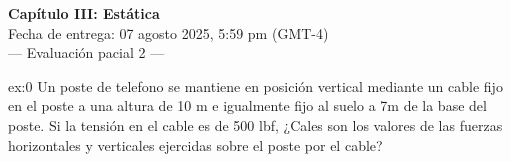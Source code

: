  \begin{multicols}{2}
     \begin{center}
         \LARGE{\textbf{Capítulo III: Estática}}\\	
         \vspace{0.2cm}
         \large{Fecha de entrega: 07 agosto 2025, 5:59 pm (GMT-4)}\\
         \large{— Evaluación pacial 2 —}
     \end{center}
     \begin{excercise}[][][$F_x=286 \ \mathrm{lbf}$, $F_y=409\ \mathrm{lbf}$]{ex:0}{
        Un poste de telefono se mantiene en posición vertical mediante un cable fijo en el poste a una altura de 10 m e igualmente fijo al suelo a 7m de la base del poste. Si la tensión en el cable es de 500 lbf, ¿Cales son los valores de las fuerzas horizontales y verticales ejercidas sobre el poste por el cable? 
         }
     \end{excercise} 


\end{multicols}
